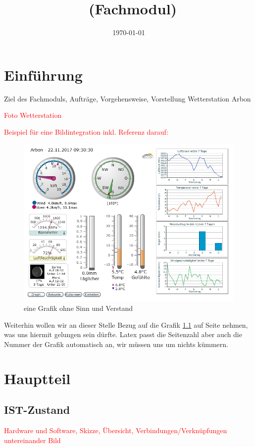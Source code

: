 \documentclass[a4paper,ngerman, 11pt, pagesize]{report}
\title{\projektName~(Fachmodul)}
\author{\authorName}
\date{\today}
\newcommand\Diskussionspunkt[1]{\textcolor{red}{#1}}
\begin{document}

\setcounter{page}{2}
\tableofcontents          
\clearpage
{}


\chapter{Einführung}
Ziel des Fachmoduls, Aufträge, Vorgehensweise, Vorstellung Wetterstation Arbon

\Diskussionspunkt{Foto Wetterstation}


\Diskussionspunkt{Beispiel für eine Bildintegration inkl. Referenz darauf:}
\begin{figure}[htbp]
	\centering
	\includegraphics[width=0.9\linewidth]{img/grafik}
	\caption{eine Grafik ohne Sinn und Verstand}
	\label{img:grafik-dummy}
\end{figure}

Weiterhin wollen wir an dieser Stelle Bezug auf die Grafik
\ref{img:grafik-dummy} auf Seite \pageref{img:grafik-dummy} nehmen, was uns
hiermit gelungen sein dürfte. Latex passt die Seitenzahl aber auch die Nummer
der Grafik automatisch an, wir müssen uns um nichts kümmern.

\chapter{Hauptteil}

\section{IST-Zustand}
\Diskussionspunkt{Hardware und Software, 
Skizze, 
Übersicht, 
Verbindungen/Verknüpfungen untereinander}
\Diskussionspunkt{Bild}
\end{document}
